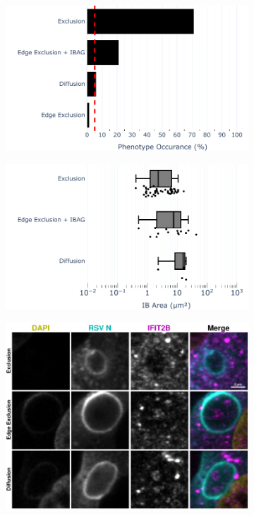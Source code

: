 \begin{figure}
    \begin{subfigure}{0.5\textwidth}
        \caption{}
        \includegraphics[width=1\linewidth]{10. Chapter 5/Figs/01. Infection/02. IFIT2B/10. bar_i2b_mdbk.pdf} 
    \end{subfigure}
    \begin{subfigure}{0.5\textwidth}
        \caption{}
        \includegraphics[width=1\linewidth]{10. Chapter 5/Figs/01. Infection/02. IFIT2B/11. box_i2b_mdbk.pdf}
    \end{subfigure}
    \begin{subfigure}{1\textwidth}
        \caption{}
        \includegraphics[width=1\linewidth]{10. Chapter 5/Figs/01. Infection/02. IFIT2B/12. i2b mdbk brsv.pdf} 

\end{subfigure}
\end{figure}
